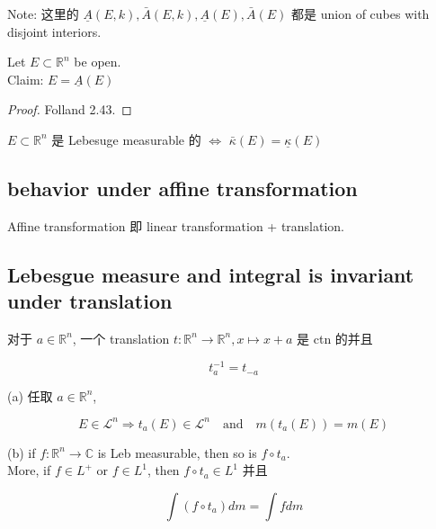 Note: 这里的 \(\underline{A}(E,k),\bar{A}(E,k),\underline{A}(E),\bar{A}(E)\) 都是 union of cubes with disjoint interiors.

\begin{lemma}{}

Let \(E \subset \mathbb{R}^{n}\) be open.\\
Claim: \(E = \underline{A}(E)\)

\end{lemma}

\begin{proof}

Folland 2.43.

\end{proof}

\begin{corollary}

\(E \subset \mathbb{R}^{n}\) 是 Lebesuge measurable 的 \(\Leftrightarrow\) \(\bar{\kappa}(E) = \underline{\kappa}(E)\)

\end{corollary}

\subsection{behavior under affine transformation}\label{behavior-under-affine-transformation}

Affine transformation 即 linear transformation + translation.

\subsection{Lebesgue measure and integral is invariant under translation}\label{lebesgue-measure-and-integral-is-invariant-under-translation}

对于 \(a \in \mathbb{R}^{n}\), 一个 translation \(t:\mathbb{R}^{n}\rightarrow\mathbb{R}^{n},x\mapsto x + a\) 是 ctn 的并且

\[t_{a}^{- 1} = t_{- a}\]

\begin{theorem}{}

(a) 任取 \(a \in \mathbb{R}^{n}\),

\[E \in \mathcal{L}^{n}\Longrightarrow t_{a}(E) \in \mathcal{L}^{n}\quad\text{and}\quad m(t_{a}(E)) = m(E)\]

(b) if \(f:\mathbb{R}^{n}\rightarrow\mathbb{C}\) is Leb measurable, then so is \(f \circ t_{a}\).\\
More, if \(f \in L^{+}\) or \(f \in L^{1}\), then \(f \circ t_{a} \in L^{1}\) 并且

\[\int(f \circ t_{a}) dm = \int f dm\]

\end{theorem}

